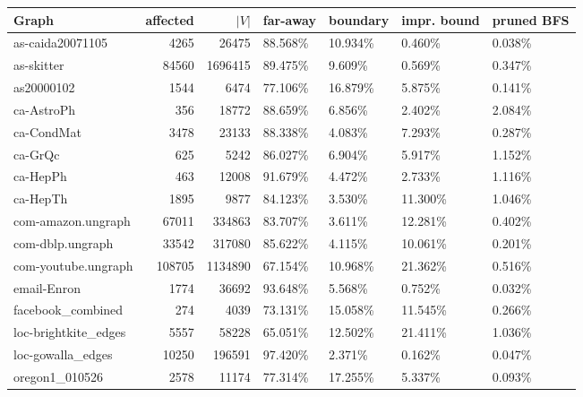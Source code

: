 \begin{table}[h!]
\begin{tabular}{lrrllll}
\toprule
 Graph                &   affected &   $|V|$ & far-away   & boundary   & impr. bound   & pruned BFS   \\
\midrule \midrule
 as-caida20071105     &       4265 &   26475 & 88.568\%    & 10.934\%    & 0.460\%        & 0.038\%   \\
 as-skitter           &      84560 & 1696415 & 89.475\%    & 9.609\%     & 0.569\%        & 0.347\%   \\
 as20000102           &       1544 &    6474 & 77.106\%    & 16.879\%    & 5.875\%        & 0.141\%   \\
 ca-AstroPh           &        356 &   18772 & 88.659\%    & 6.856\%     & 2.402\%        & 2.084\%   \\
 ca-CondMat           &       3478 &   23133 & 88.338\%    & 4.083\%     & 7.293\%        & 0.287\%   \\
 ca-GrQc              &        625 &    5242 & 86.027\%    & 6.904\%     & 5.917\%        & 1.152\%   \\
 ca-HepPh             &        463 &   12008 & 91.679\%    & 4.472\%     & 2.733\%        & 1.116\%   \\
 ca-HepTh             &       1895 &    9877 & 84.123\%    & 3.530\%     & 11.300\%       & 1.046\%   \\
 com-amazon.ungraph   &      67011 &  334863 & 83.707\%    & 3.611\%     & 12.281\%       & 0.402\%   \\
 com-dblp.ungraph     &      33542 &  317080 & 85.622\%    & 4.115\%     & 10.061\%       & 0.201\%   \\
 com-youtube.ungraph  &     108705 & 1134890 & 67.154\%    & 10.968\%    & 21.362\%       & 0.516\%   \\
 email-Enron          &       1774 &   36692 & 93.648\%    & 5.568\%     & 0.752\%        & 0.032\%   \\
 facebook\_combined    &        274 &    4039 & 73.131\%    & 15.058\%    & 11.545\%       & 0.266\%   \\
 loc-brightkite\_edges &       5557 &   58228 & 65.051\%    & 12.502\%    & 21.411\%       & 1.036\%   \\
 loc-gowalla\_edges    &      10250 &  196591 & 97.420\%    & 2.371\%     & 0.162\%        & 0.047\%   \\
 oregon1\_010526       &       2578 &   11174 & 77.314\%    & 17.255\%    & 5.337\%        & 0.093\%   \\

\end{tabular}
\end{table}
